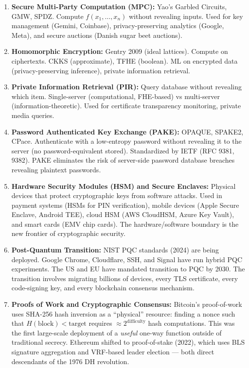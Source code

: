 \begin{enumerate}
\item \textbf{Secure Multi-Party Computation (MPC):} Yao's Garbled Circuits, GMW, SPDZ. Compute $f(x_1,\dots,x_n)$ without revealing inputs. Used for key management (Gemini, Coinbase), privacy-preserving analytics (Google, Meta), and secure auctions (Danish sugar beet auctions).

\item \textbf{Homomorphic Encryption:} Gentry 2009 (ideal lattices). Compute on ciphertexts. CKKS (approximate), TFHE (boolean). ML on encrypted data (privacy-preserving inference), private information retrieval.

\item \textbf{Private Information Retrieval (PIR):} Query database without revealing which item. Single-server (computational, FHE-based) vs multi-server (information-theoretic). Used for certificate transparency monitoring, private media queries.

\item \textbf{Password Authenticated Key Exchange (PAKE):} OPAQUE, SPAKE2, CPace. Authenticate with a low-entropy password without revealing it to the server (no password-equivalent stored). Standardized by IETF (RFC 9381, 9382). PAKE eliminates the risk of server-side password database breaches revealing plaintext passwords.

\item \textbf{Hardware Security Modules (HSM) and Secure Enclaves:} Physical devices that protect cryptographic keys from software attacks. Used in payment systems (HSMs for PIN verification), mobile devices (Apple Secure Enclave, Android TEE), cloud HSM (AWS CloudHSM, Azure Key Vault), and smart cards (EMV chip cards). The hardware/software boundary is the new frontier of cryptographic security.

\item \textbf{Post-Quantum Transition:} NIST PQC standards (2024) are being deployed. Google Chrome, Cloudflare, SSH, and Signal have run hybrid PQC experiments. The US and EU have mandated transition to PQC by 2030. The transition involves migrating billions of devices, every TLS certificate, every code-signing key, and every blockchain consensus mechanism.

\item \textbf{Proofs of Work and Cryptographic Consensus:} Bitcoin's proof-of-work uses SHA-256 hash inversion as a ``physical'' resource: finding a nonce such that $H(\text{block}) < \text{target}$ requires $\approx 2^{\text{difficulty}}$ hash computations. This was the first large-scale deployment of a \emph{useful} one-way function outside of traditional secrecy. Ethereum shifted to proof-of-stake (2022), which uses BLS signature aggregation and VRF-based leader election — both direct descendants of the 1976 DH revolution.


\end{enumerate}
